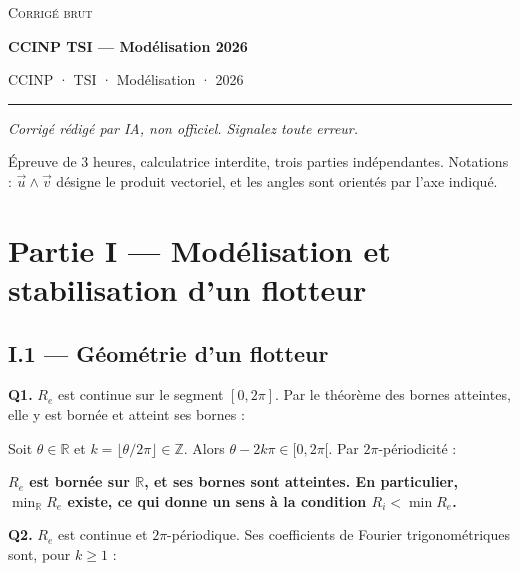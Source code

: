\documentclass[11pt,a4paper]{article}
\newcommand{\equationajustee}[1]{%
  \sbox{\boiteequation}{$\displaystyle #1$}%
  \ifdim\wd\boiteequation>\linewidth
    \[\resizebox{\linewidth}{!}{\usebox{\boiteequation}}\]%
  \else
    \[#1\]%
  \fi}
\begin{document}
\thispagestyle{plain}
\begin{center}
  {\small\scshape Corrigé brut}\par\smallskip
  {\LARGE\bfseries CCINP TSI — Modélisation 2026\par}\medskip
  {\large CCINP · TSI · Modélisation · 2026\par}
\end{center}
\vspace{2pt}\hrule\vspace{8pt}

\emph{Corrigé rédigé par IA, non officiel. Signalez toute erreur.}

Épreuve de 3 heures, calculatrice interdite, trois parties indépendantes. Notations : \(\vec u\wedge\vec v\) désigne le produit vectoriel, et les angles sont orientés par l'axe indiqué.

\hypertarget{partie-i-moduxe9lisation-et-stabilisation-dun-flotteur}{%
\section{Partie I --- Modélisation et stabilisation d'un flotteur}\label{partie-i-moduxe9lisation-et-stabilisation-dun-flotteur}}

\hypertarget{i.1-guxe9omuxe9trie-dun-flotteur}{%
\subsection{I.1 --- Géométrie d'un flotteur}\label{i.1-guxe9omuxe9trie-dun-flotteur}}

\textbf{Q1.} \(R_e\) est continue sur le segment \([0,2\pi]\). Par le théorème des bornes atteintes, elle y est bornée et atteint ses bornes :

\equationajustee{\begin{aligned}
m&=\min_{[0,2\pi]}R_e\\
M&=\max_{[0,2\pi]}R_e
\end{aligned}}

Soit \(\theta\in\mathbb{R}\) et \(k=\lfloor\theta/2\pi\rfloor\in\mathbb{Z}\). Alors \(\theta-2k\pi\in[0,2\pi[\). Par \(2\pi\)-périodicité :

\equationajustee{R_e(\theta)=R_e(\theta-2k\pi)\in[m,M].}

\textbf{\(R_e\) est bornée sur \(\mathbb{R}\), et ses bornes sont atteintes. En particulier, \(\min_{\mathbb{R}}R_e\) existe, ce qui donne un sens à la condition \(R_i<\min R_e\).}

\textbf{Q2.} \(R_e\) est continue et \(2\pi\)-périodique. Ses coefficients de Fourier trigonométriques sont, pour \(k\geqslant1\) :
\end{document}
